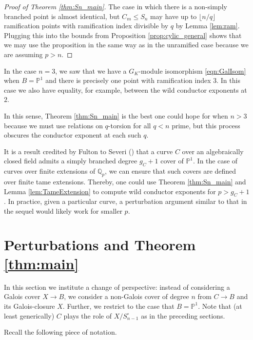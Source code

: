 \documentclass[12pt]{amsart}
\theoremstyle{definition}
\newenvironment{remark}
  {\pushQED{\qed}\renewcommand{\qedsymbol}{$\diamondsuit$}\remarkx}
  {\popQED\endremarkx}
\theoremstyle{remark}
\newcommand{\QQ}{\mathbb{Q}}
\newcommand{\Proj}{\mathbb{P}}
\begin{document}
\begin{proof}[Proof of Theorem \ref{thm:Sn_main}]
    The case in which there is a non-simply branched point is almost identical, but $C_m\le S_n$ may have up to $\lfloor n/q\rfloor$ ramification points with ramification index divisible by $q$ by Lemma \ref{lem:ram}. Plugging this into the bounds from Proposition \ref{prop:cylic_general} shows that we may use the proposition in the same way as in the unramified case because we are assuming $p>n$.
\end{proof}

\begin{remark}
    In the case $n=3$, we saw that we have a $G_K$-module isomorphism \eqref{eqn:GalIsom} when $B=\Proj^1$ and there is precisely one point with ramification index $3$. In this case we also have equality, for example, between the wild conductor exponents at $2$. 

    In this sense, Theorem \ref{thm:Sn_main} is the best one could hope for when $n>3$ because we must use relations on $q$-torsion for all $q<n$ prime, but this process obscures the conductor exponent at each such $q$.
\end{remark}

\begin{remark}\label{rmk:FultonVariant}
    It is a result credited by Fulton to Severi (\cite[Proposition 8.1]{Fulton69}) that a curve $C$ over an algebraically closed field admits a simply branched degree $g_C+1$ cover of $\Proj^1$. In the case of curves over finite extensions of $\QQ_p$, we can ensure that such covers are defined over finite tame extensions. Thereby, one could use Theorem \ref{thm:Sn_main} and Lemma \ref{lem:TameExtension} to compute wild conductor exponents for $p>g_C+1$. In practice, given a particular curve, a perturbation argument similar to that in the sequel would likely work for smaller $p$.
\end{remark}

\section{Perturbations and Theorem \ref{thm:main}}\label{sec:perturb}

In this section we institute a change of perspective: instead of considering a Galois cover $X\to B$, we consider a non-Galois cover of degree $n$ from $C\to B$ and its Galois-closure $X$. Further, we restrict to the case that $B=\Proj^1$. Note that (at least generically) $C$ plays the role of $X/S_{n-1}^\circ$ as in the preceding sections.

Recall the following piece of notation.
\end{document}
